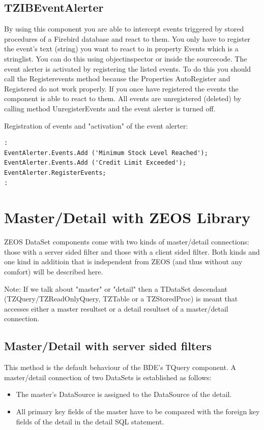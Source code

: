 \documentclass[a4paper,12pt,oneside]{book}
\begin{document}
\section{TZIBEventAlerter}
By using this component you are able to intercept events triggered by stored procedures of a Firebird
database and react to them.
You only have to register the event's text (string) you want to react to in property Events which is a stringlist.
You can do this using objectinspector or inside the sourcecode.
The event alerter is activated by registering the listed events.
To do this you should call the Registerevents method because the Properties AutoRegister and Registered do not work properly.
If you once have registered the events the component is able to react to them.
All events are unregistered (deleted) by calling method UnregisterEvents and the event alerter is turned off.

Registration of events and "activation" of the event alerter:

\begin{verbatim}
:
EventAlerter.Events.Add ('Minimum Stock Level Reached');
EventAlerter.Events.Add ('Credit Limit Exceeded');
EventAlerter.RegisterEvents;
:
\end{verbatim}

\chapter{Master/Detail with ZEOS Library}
ZEOS DataSet components come with two kinds of master/detail connections:
those with a server sided filter and those with a client sided filter.
Both kinds and one kind in additioin that is independent from ZEOS (and thus without any comfort) will be described here.

Note: If we talk about "master" or "detail" then a TDataSet descendant (TZQuery/TZReadOnlyQuery, TZTable or a TZStoredProc) is meant that accesses either a master resultset or a detail resultset of a master/detail connection.

\section{Master/Detail with server sided filters}
This method is the default behaviour of the BDE's TQuery component.
A master/detail connection of two DataSets is established as follows:

\begin{itemize}
  \item The master's DataSource is assigned to the DataSource of the detail.
	\item All primary key fields of the master have to be compared with the foreign key fields of the detail in the detail SQL statement.
\end{itemize}
\end{document}
